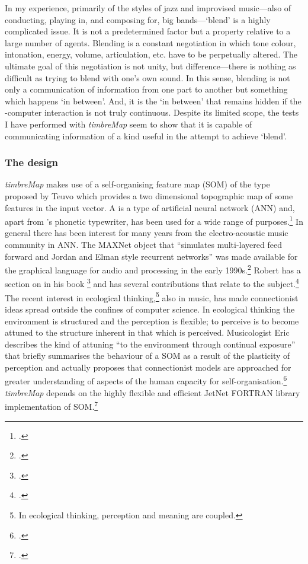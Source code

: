 In my experience, primarily of the styles of jazz and improvised music---also of conducting, playing in, and composing for, big bands---`blend' is a highly complicated issue. It is not a predetermined factor but a property relative to a large number of agents. Blending is a constant negotiation in which tone colour, intonation, energy, volume, articulation, etc. have to be perpetually altered. The ultimate goal of this negotiation is not unity, but difference---there is nothing as difficult as trying to blend with one's own sound. In this sense, blending is not only a communication of information from one part to another but something which happens `in between'. And, it is the `in between' that remains hidden if the -computer interaction is not truly continuous. Despite its limited scope, the tests I have performed with \emph{timbreMap} seem to show that it is capable of communicating information of a kind useful in the attempt to achieve `blend'.

\subsubsection{The design}
\label{sec:timap-design}

\emph{timbreMap} makes use of a self-organising feature map (SOM) of the type proposed by Teuvo \citeauthor{kohonen88} which provides a two dimensional topographic map of some features in the input vector. A  is a type of artificial neural network (ANN) and, apart from \citeauthor{kohonen88}'s phonetic typewriter, has been used for a wide range of purposes.\footcite[See][137--40]{gurney97} In general there has been interest for many years from the electro-acoustic music community in ANN. The MAXNet object that ``simulates multi-layered feed forward and Jordan and Elman style recurrent networks'' was made available for the  graphical language for audio and  processing in the early 1990s.\footcite{wessel91} Robert \citeauthor{rowe} has a section on  in his book \footcite[chap. 7]{rowe} and  has several contributions that relate to the subject.\footcite{miranda99} The recent interest in ecological thinking,\footnote{In ecological thinking, perception and meaning are coupled.} also in music, has made connectionist ideas spread outside the confines of computer science. In ecological thinking the environment is structured and the perception is flexible; to perceive is to become attuned to the structure inherent in that which is perceived. Musicologist Eric \citeauthor{clarke05} describes the kind of attuning ``to the environment through continual exposure'' that briefly summarises the behaviour of a SOM as a result of the plasticity of perception and actually proposes that connectionist models are approached for greater understanding of aspects of the human capacity for self-organisation.\footcite{clarke05} \emph{timbreMap} depends on the highly flexible and efficient JetNet FORTRAN library implementation of SOM.\footcite{lonnblad91}


